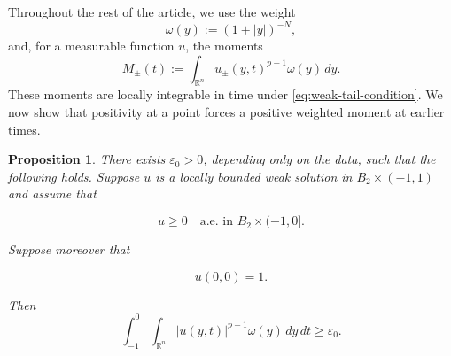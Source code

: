\documentclass[10pt]{amsart}
\theoremstyle{plain}
\newtheorem{proposition}[lemma]{Proposition}
\theoremstyle{definition}
\theoremstyle{remark}
\numberwithin{equation}{section}
\newcommand{\R}{\mathbb R}
\begin{document}
Throughout the rest of the article, we use the weight
\[
    \omega(y):=(1+|y|)^{-N},
\]
and, for a measurable function $u$, the moments
\begin{equation}\label{eq:weighted-moments}
M_\pm(t):=\int_{\R^n}u_\pm(y,t)^{p-1}\omega(y)\,dy.
\end{equation}
These moments are locally integrable in time under
\eqref{eq:weak-tail-condition}. We now show that positivity at a point
forces a positive weighted moment at earlier times.

\begin{proposition}\label{prop:moment}
There exists $\varepsilon_0>0$, depending only on the data, such that the
following holds. Suppose $u$ is a locally bounded weak solution in
$B_2\times(-1,1)$ and assume that

\[
    u\ge0
    \quad\text{a.e. in }B_2\times(-1,0].
\]

Suppose moreover that

\[
    u(0,0)=1.
\]

Then
\begin{equation}\label{eq:absolute-moment}
\int_{-1}^0
\int_{\R^n}
|u(y,t)|^{p-1}\omega(y)\,dy\,dt
\ge\varepsilon_0.
\end{equation}
\end{proposition}
\end{document}
